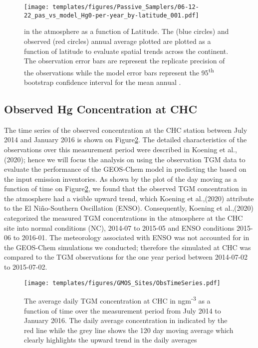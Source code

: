 \begin{figure}[H]
  \texttt{[image: templates/figures/Passive\_Samplers/06-12-22\_pas\_vs\_model\_Hg0-per-year\_by-latitude\_001.pdf]}
  \caption{\hg in the atmosphere as a function of Latitude. The \on (blue circles) and observed (red circles) annual average \hg plotted are plotted as a function of latitude to evaluate spatial trends across the continent. The observation error bars are represent the replicate precision of the observations while the model error bars represent the 95\textsuperscript{th} bootstrap confidence interval for the mean annual \hg.}
  \label{fig:06-12-22_pas_vs_model_Hg0-per-year_by-latitude_001}
  \centering
  
\end{figure}
\FloatBarrier



\subsection{Observed Hg Concentration at CHC}
\begin{flushleft}
The time series of the observed concentration at the CHC station between July 2014 and January 2016 is shown on Figure\ref{fig:ObsTseries}. The detailed characteristics of the observations over this measurement period were described in Koening et al.,(2020); hence we will focus the analysis on using the observation TGM data to evaluate the performance of the GEOS-Chem model in predicting the \hg  based on the input \hg emission inventories. As shown by the plot of the  day moving as a function of time on Figure\ref{fig:ObsTseries}, we found that the observed TGM concentration in the atmosphere had a visible upward trend, which Koening et al.,(2020) attribute to the El Niño-Southern Oscillation (ENSO). Consequently, Koening et al.,(2020) categorized the measured TGM concentrations in the atmosphere at the CHC site into normal conditions (NC), 2014-07 to 2015-05 and ENSO conditions  2015-06 to 2016-01. The meteorology associated with ENSO was not accounted for in the GEOS-Chem \hg simulations we conducted; therefore the simulated \hg  at CHC was compared to the TGM observations for the one year period between 2014-07-02 to 2015-07-02.
\end{flushleft}

\begin{figure}[H]
  \texttt{[image: templates/figures/GMOS\_Sites/ObsTimeSeries.pdf]}
 
  \caption{The average daily TGM concentration at CHC in ngm\textsuperscript{-3} as a function of time over the measurement period from July 2014 to January 2016. The daily average concentration in indicated by the red line while the grey line shows the 120 day moving average which clearly highlights the upward trend in the daily averages}
  \label{fig:ObsTseries}
  \centering
\end{figure}
\FloatBarrier

